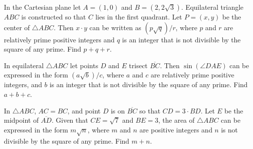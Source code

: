 %	
















\begin{question}[name={2013 AIME II, \href{https://artofproblemsolving.com/community/c4p3003338}{Problem 4}}]
	In the Cartesian plane let $A = (1,0)$ and $B = \left( 2, 2\sqrt{3} \right)$. Equilateral triangle $ABC$ is constructed so that $C$ lies in the first quadrant. Let $P=(x,y)$ be the center of $\triangle ABC$. Then $x \cdot y$ can be written as $(p\sqrt{q})/{r}$, where $p$ and $r$ are relatively prime positive integers and $q$ is an integer that is not divisible by the square of any prime. Find $p+q+r$.
\end{question}


%	













\begin{question}[name={2013 AIME II, \href{https://artofproblemsolving.com/community/c4p3003340}{Problem 5}}]
	In equilateral $\triangle ABC$ let points $D$ and $E$ trisect $\overline{BC}$. Then $\sin \left( \angle DAE \right)$ can be expressed in the form $(a\sqrt{b})/{c}$, where $a$ and $c$ are relatively prime positive integers, and $b$ is an integer that is not divisible by the square of any prime. Find $a+b+c$.	
\end{question}


%	








\begin{question}[name={2013 AIME II, \href{https://artofproblemsolving.com/community/c4p3003350}{Problem 13}}]
	In $\triangle ABC$, $AC = BC$, and point $D$ is on $\overline{BC}$ so that $CD = 3 \cdot BD$. Let $E$ be the midpoint of $\overline{AD}$. Given that $CE = \sqrt{7}$ and $BE = 3$, the area of $\triangle ABC$ can be expressed in the form $m\sqrt{n}$, where $m$ and $n$ are positive integers and $n$ is not divisible by the square of any prime. Find $m+n$.
\end{question}


